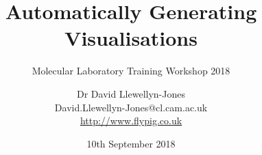 \documentclass[handout, notes=hide]{beamer}
\renewcommand{\thefootnote}{\fnsymbol{footnote}}
\begin{document}
\title{Automatically Generating Visualisations}
\subtitle{Molecular Laboratory Training Workshop 2018}
\author{Dr David Llewellyn-Jones\\\vspace{0.5cm}\scriptsize David.Llewellyn-Jones@cl.cam.ac.uk\\\href{http://www.flypig.co.uk}{http://www.flypig.co.uk}}
\institute{}
\date{10th September 2018}


\renewcommand{\thefootnote}{\arabic{footnote}}


\renewcommand{\thefootnote}{\fnsymbol{footnote}}

\end{document}
